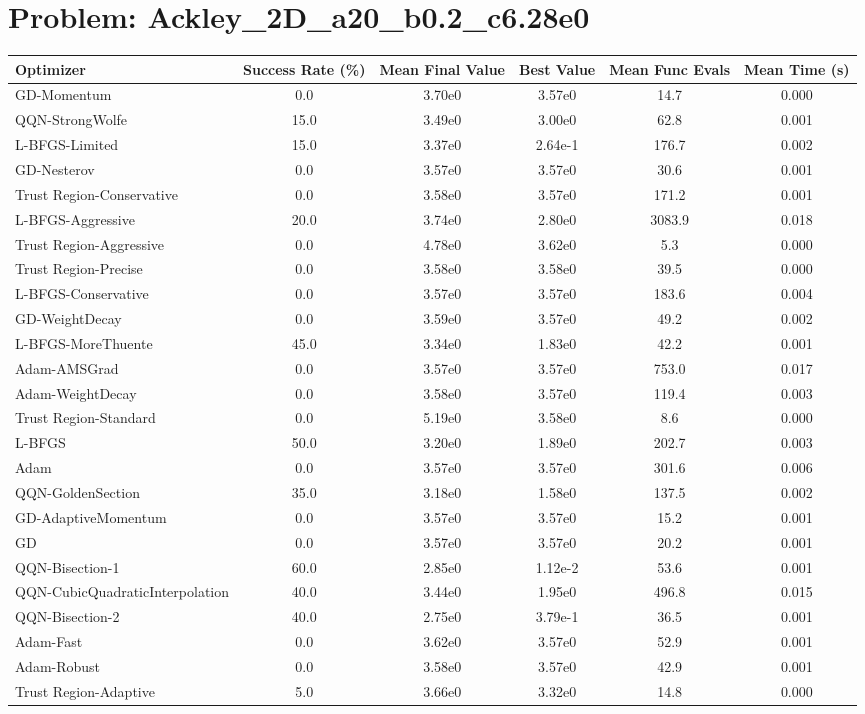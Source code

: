 \documentclass{article}
\begin{document}
\section{Problem: Ackley\_2D\_a20\_b0.2\_c6.28e0}
\begin{longtable}{p{3cm}*{5}{c}}
\toprule
\textbf{Optimizer} & \textbf{Success Rate (\%)} & \textbf{Mean Final Value} & \textbf{Best Value} & \textbf{Mean Func Evals} & \textbf{Mean Time (s)} \\
\midrule
GD-Momentum & 0.0 & 3.70e0 & 3.57e0 & 14.7 & 0.000 \\
QQN-StrongWolfe & 15.0 & 3.49e0 & 3.00e0 & 62.8 & 0.001 \\
L-BFGS-Limited & 15.0 & 3.37e0 & 2.64e-1 & 176.7 & 0.002 \\
GD-Nesterov & 0.0 & 3.57e0 & 3.57e0 & 30.6 & 0.001 \\
Trust Region-Conservative & 0.0 & 3.58e0 & 3.57e0 & 171.2 & 0.001 \\
L-BFGS-Aggressive & 20.0 & 3.74e0 & 2.80e0 & 3083.9 & 0.018 \\
Trust Region-Aggressive & 0.0 & 4.78e0 & 3.62e0 & 5.3 & 0.000 \\
Trust Region-Precise & 0.0 & 3.58e0 & 3.58e0 & 39.5 & 0.000 \\
L-BFGS-Conservative & 0.0 & 3.57e0 & 3.57e0 & 183.6 & 0.004 \\
GD-WeightDecay & 0.0 & 3.59e0 & 3.57e0 & 49.2 & 0.002 \\
L-BFGS-MoreThuente & 45.0 & 3.34e0 & 1.83e0 & 42.2 & 0.001 \\
Adam-AMSGrad & 0.0 & 3.57e0 & 3.57e0 & 753.0 & 0.017 \\
Adam-WeightDecay & 0.0 & 3.58e0 & 3.57e0 & 119.4 & 0.003 \\
Trust Region-Standard & 0.0 & 5.19e0 & 3.58e0 & 8.6 & 0.000 \\
L-BFGS & 50.0 & 3.20e0 & 1.89e0 & 202.7 & 0.003 \\
Adam & 0.0 & 3.57e0 & 3.57e0 & 301.6 & 0.006 \\
QQN-GoldenSection & 35.0 & 3.18e0 & 1.58e0 & 137.5 & 0.002 \\
GD-AdaptiveMomentum & 0.0 & 3.57e0 & 3.57e0 & 15.2 & 0.001 \\
GD & 0.0 & 3.57e0 & 3.57e0 & 20.2 & 0.001 \\
QQN-Bisection-1 & 60.0 & 2.85e0 & 1.12e-2 & 53.6 & 0.001 \\
QQN-CubicQuadraticInterpolation & 40.0 & 3.44e0 & 1.95e0 & 496.8 & 0.015 \\
QQN-Bisection-2 & 40.0 & 2.75e0 & 3.79e-1 & 36.5 & 0.001 \\
Adam-Fast & 0.0 & 3.62e0 & 3.57e0 & 52.9 & 0.001 \\
Adam-Robust & 0.0 & 3.58e0 & 3.57e0 & 42.9 & 0.001 \\
Trust Region-Adaptive & 5.0 & 3.66e0 & 3.32e0 & 14.8 & 0.000 \\
\bottomrule
\end{longtable}
\end{document}
